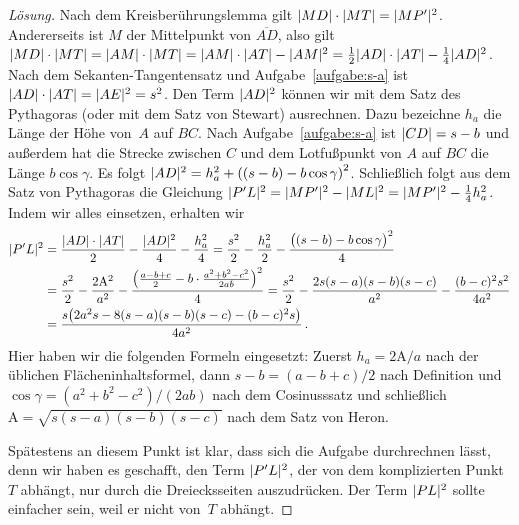 \begin{proof}[Lösung]
	Nach dem Kreisberührungslemma gilt $\abs{MD}\cdot \abs{MT}=\abs{MP'}^2$. Andererseits ist $M$ der Mittelpunkt von $\overline{AD}$, also gilt $\abs{MD}\cdot \abs{MT}=\abs{AM}\cdot \abs{MT}=\abs{AM}\cdot \abs{AT}-\abs{AM}^2=\frac12\abs{AD}\cdot\abs{AT}-\frac14\abs{AD}^2$. Nach dem Sekanten-Tangentensatz und Aufgabe~\ref{aufgabe:s-a} ist $\abs{AD}\cdot \abs{AT}=\abs{AE}^2=s^2$. Den Term $\abs{AD}^2$ können wir mit dem Satz des Pythagoras (oder mit dem Satz von Stewart) ausrechnen. Dazu bezeichne $h_a$ die Länge der Höhe von~$A$ auf $BC$. Nach Aufgabe~\ref{aufgabe:s-a} ist $\abs{CD}=s-b$ und außerdem hat die Strecke zwischen $C$ und dem Lotfußpunkt von $A$ auf $BC$ die Länge $b\cos\gamma$. Es folgt $\abs{AD}^2=h_a^2+\parens*{(s-b)-b\cos\gamma}^2$. Schließlich folgt aus dem Satz von Pythagoras die Gleichung $\abs{P'L}^2=\abs{MP'}^2-\abs{ML}^2=\abs{MP'}^2-\frac14h_a^2$. Indem wir alles einsetzen, erhalten wir
	\begin{align*}
		\abs{P'L}^2&=\frac{\abs{AD}\cdot \abs{AT}}{2}-\frac{\abs{AD}^2}{4}-\frac{h_a^2}{4}=\frac{s^2}{2}-\frac{h_a^2}{2}-\frac{\parens[\big]{(s-b)-b\cos\gamma}^2}{4}\\
		&=\frac{s^2}{2}-\frac{2\mathrm{A}^2}{a^2}-\frac{\parens*{\frac{a-b+c}{2}-b\cdot \frac{a^2+b^2-c^2}{2ab}}^2}{4}=\frac{s^2}{2}-\frac{2s(s-a)(s-b)(s-c)}{a^2}-\frac{(b-c)^2s^2}{4a^2}\\
		&=\frac{s\parens*{2a^2s-8(s-a)(s-b)(s-c)-(b-c)^2s}}{4a^2}\,.
	\end{align*}
	Hier haben wir die folgenden Formeln eingesetzt: Zuerst $h_a=2\mathrm{A}/a$ nach der üblichen Flächeninhaltsformel, dann $s-b=(a-b+c)/2$ nach Definition und $\cos\gamma=(a^2+b^2-c^2)/(2ab)$ nach dem Cosinusssatz und schließlich $\mathrm{A}=\sqrt{s(s-a)(s-b)(s-c)}$ nach dem Satz von Heron.
	
	Spätestens an diesem Punkt ist klar, dass sich die Aufgabe durchrechnen lässt, denn wir haben es geschafft, den Term $\abs{P'L}^2$, der von dem komplizierten Punkt~$T$ abhängt, nur durch die Dreiecksseiten auszudrücken. Der Term $\abs{PL}^2$ sollte einfacher sein, weil er nicht von~$T$ abhängt.
	

\end{proof}
